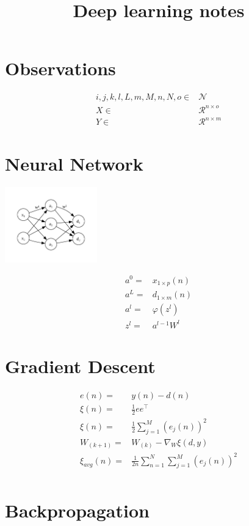 \documentclass{rbt-mathnotes-formula-sheet}
\title{Deep learning notes}
\begin{document}
\section{Observations}
\begin{eqnarray}
    i,j,k,l,L,m,M,n,N,o \in & \mathcal{N} \\
    X \in & \mathcal{R}^{n \times o} \\
    Y \in & \mathcal{R}^{n \times m}
\end{eqnarray}

\section{Neural Network}

\includegraphics[width=0.3\textwidth]{net.pdf}

\begin{eqnarray}
    a^0 = & x_{1 \times p}(n) \\
    a^L = & d_{1 \times m}(n) \\
    a^l = & \varphi (z^l) \\
    z^l = &  a^{l - 1} W^l
\end{eqnarray}

\section{Gradient Descent}

\begin{eqnarray}
    e(n) = & y(n) - d(n) \\
    \xi(n) = & \frac{1}{2} e e^{\top}\\
    \xi(n) = & \frac{1}{2} \sum_{j=1}^{M} (e_j(n))^2 \\
    W_{(k + 1)} = & W_{(k)} - \nabla_{W} \xi(d,y) \\
    \xi_{avg}(n) = & \frac{1}{2n} \sum_{n=1}^N \sum_{j=1}^{M} (e_j(n))^2 \\
\end{eqnarray}

\section{Backpropagation}
\end{document}
